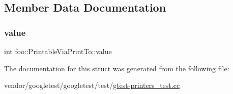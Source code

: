 \subsection{Member Data Documentation}
\mbox{\label{structfoo_1_1_printable_via_print_to_a16f8c6420275d86f0d0112ca5a41bca2}} 
\subsubsection{\texorpdfstring{value}{value}}
{\footnotesize\ttfamily int foo\+::\+Printable\+Via\+Print\+To\+::value}



The documentation for this struct was generated from the following file\+:\begin{DoxyCompactItemize}
\item 
vendor/googletest/googletest/test/\hyperlink{gtest-printers__test_8cc}{gtest-\/printers\+\_\+test.\+cc}\end{DoxyCompactItemize}
